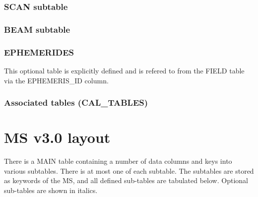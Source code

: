 \documentclass{article}
\begin{document}
\begin{itemize}
\subsubsection{SCAN subtable}


\subsubsection{BEAM subtable}

\subsubsection{EPHEMERIDES}
This optional table is explicitly defined and is refered to from the FIELD table via the EPHEMERIS\_ID column.



\subsubsection{Associated tables (CAL\_TABLES)}



\section{MS v3.0 layout}

There is a MAIN table containing a number of data columns and keys
into various subtables. There is at most one of each subtable. The
subtables are stored as keywords of the MS, and all defined sub-tables
are tabulated below.  Optional sub-tables are shown in italics.


\end{itemize}
\end{document}
